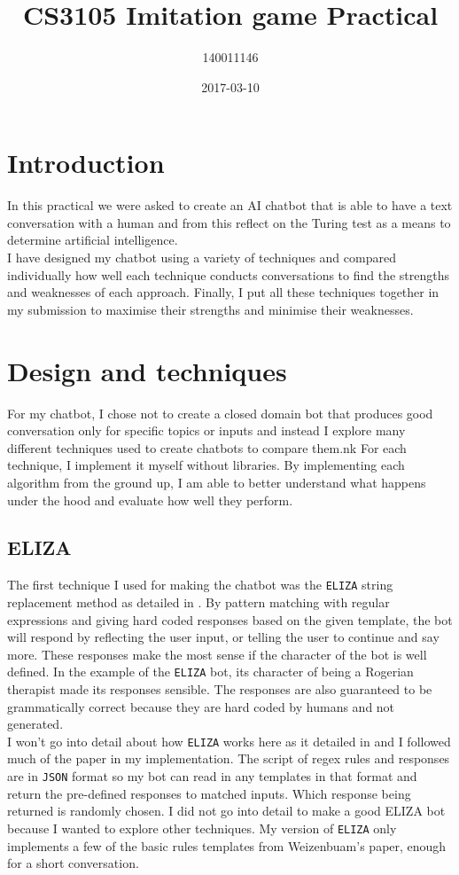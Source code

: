 \documentclass{article}
\title{CS3105 Imitation game Practical}
\date{2017-03-10}
\author{140011146}
\newcommand{\n}[0]{\\[\baselineskip]}
\begin{document}
\maketitle



\section{Introduction}
In this practical we were asked to create an AI chatbot that is able to have a text conversation with a human and from this reflect on the Turing test as a means to determine artificial intelligence.
\n
I have designed my chatbot using a variety of techniques and compared individually how well each technique conducts conversations to find the strengths and weaknesses of each approach. Finally, I put all these techniques together in my submission to maximise their strengths and minimise their weaknesses.
\section{Design and techniques}
For my chatbot, I chose not to create a closed domain bot that produces good conversation only for specific topics or inputs and instead I explore many different techniques used to create chatbots to compare them.nk For each technique, I implement it myself without libraries. By implementing each algorithm from the ground up, I am able to better understand what happens under the hood and evaluate how well they perform.
\subsection{ELIZA}
The first technique I used for making the chatbot was the \texttt{ELIZA} string replacement method as detailed in \cite{eliza}. By pattern matching with regular expressions and giving hard coded responses based on the given template, the bot will respond by reflecting the user input, or telling the user to continue and say more. These responses make the most sense if the character of the bot is well defined. In the example of the \texttt{ELIZA} bot, its character of being a Rogerian therapist made its responses sensible. The responses are also guaranteed to be grammatically correct because they are hard coded by humans and not generated.  
\n
I won't go into detail about how \texttt{ELIZA} works here as it detailed in \cite{eliza} and I followed much of the paper in my implementation. The script of regex rules and responses are in \texttt{JSON} format so my bot can read in any templates in that format and return the pre-defined responses to matched inputs. Which response being returned is randomly chosen. I did not go into detail to make a good ELIZA bot because I wanted to explore other techniques. My version of \texttt{ELIZA} only implements a few of the basic rules templates from Weizenbuam's paper, enough for a short conversation.
\end{document}
